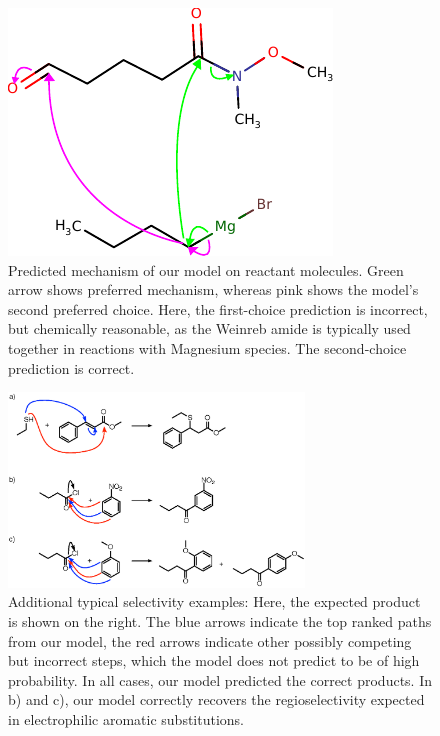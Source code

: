 \begin{figure}[h]
        \centering
        \includegraphics{imgs/textbook/reactants2}
        \caption{Predicted mechanism of our model on reactant molecules. Green arrow shows preferred mechanism, whereas pink shows the model's second preferred choice. Here, the first-choice prediction is incorrect, but chemically reasonable, as the Weinreb amide is typically used together in reactions with Magnesium species. The second-choice prediction is correct.}
        \label{fig:extra-textbook-example}
\end{figure}

\begin{figure}[h]
        \centering
        \includegraphics[width=0.7\textwidth]{imgs/textbook/additionalexamples.eps}
        \caption{Additional typical selectivity examples: Here, the expected product is shown on the right. The blue arrows indicate the top ranked paths from our model, the red arrows indicate other possibly competing but incorrect steps, which the model does not predict to be of high probability. In all cases, our model predicted the correct products. In b) and c), our model correctly recovers the regioselectivity expected in electrophilic aromatic substitutions.}
        \label{fig:extra-textbook-example2}
\end{figure}





